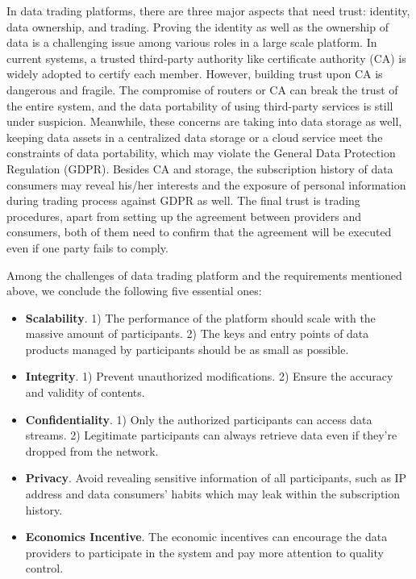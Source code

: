 \begin{spacing}{2.0}
In data trading platforms, there are three major aspects that need trust: identity, data ownership, and trading. Proving the identity as well as the ownership of data is a challenging issue among various roles in a large scale platform. In current systems, a trusted third-party authority like certificate authority (CA) is widely adopted to certify each member. However, building trust upon CA is dangerous and fragile. The compromise of routers or CA can break the trust of the entire system, and the data portability of using third-party services is still under suspicion. Meanwhile, these concerns are taking into data storage as well, keeping data assets in a centralized data storage or a cloud service meet the constraints of data portability, which may violate the General Data Protection Regulation (GDPR)\cite{GDPR}. Besides CA and storage, the subscription history of data consumers may reveal his/her interests and the exposure of personal information during trading process against GDPR as well. The final trust is trading procedures, apart from setting up the agreement between providers and consumers, both of them need to confirm that the agreement will be executed even if one party fails to comply.

Among the challenges of data trading platform\cite{BigDataMarket} and the requirements mentioned above, we conclude the following five essential ones:
\begin{itemize}
    \item \textbf{Scalability}.
1) The performance of the platform should scale with the massive amount of participants. 2) The keys and entry points of data products managed by participants should be as small as possible.
    \item \textbf{Integrity}. 1) Prevent unauthorized modifications. 2) Ensure the accuracy and validity of contents.
    \item \textbf{Confidentiality}.
1) Only the authorized participants can access data streams. 2) Legitimate participants can always retrieve data even if they're dropped from the network.
    \item \textbf{Privacy}. Avoid revealing sensitive information of all participants, such as IP address and data consumers' habits which may leak within the subscription history.
    \item \textbf{Economics Incentive}. The economic incentives can encourage the data providers to participate in the system and pay more attention to quality control.
\end{itemize}


\end{spacing}
